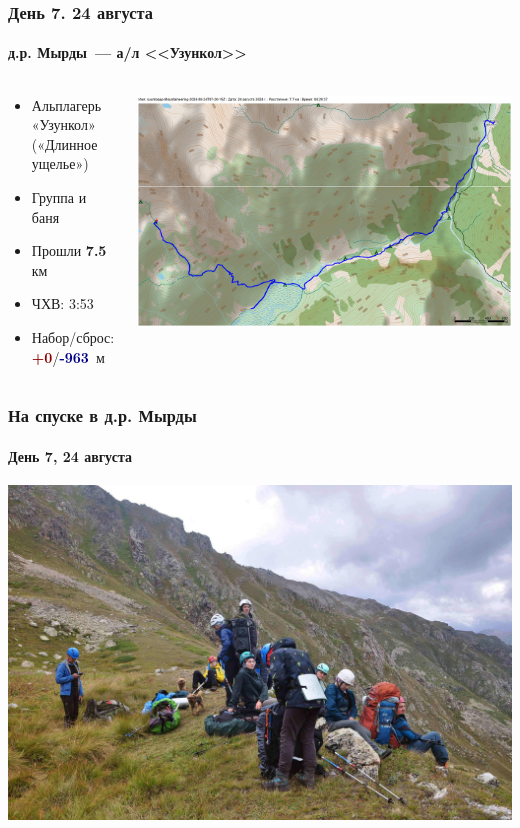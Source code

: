	\begin{frame}
	\frametitle{День 7. 24 августа}
	\framesubtitle{д.р. Мырды~--- а/л <<Узункол>>	} %
	\begin{columns}[c] %
		\begin{column}{0.55\textwidth} %
			\begin{itemize}
				\item Альплагерь «Узункол» («Длинное ущелье»)
				\item Группа и баня
				\item Прошли \textbf{7.5} км
				\item ЧХВ: 3:53
				\item Набор/сброс: \textcolor{darkred}{\textbf{+0}}/\textcolor{darkblue}{\textbf{-963}}~м
			\end{itemize}
			
		\end{column}
		\begin{column}{0.45\textwidth} %
			\centering
			\includegraphics[width=\linewidth]{../pics/mini_maps/24}
		\end{column}
	\end{columns}
\end{frame}

\begin{frame}
	\frametitle{На спуске в д.р. Мырды}
	\framesubtitle{День 7, 24 августа}
	\centering
	\includegraphics[width=\textwidth]{../pics/DSC_0104}			
\end{frame}

